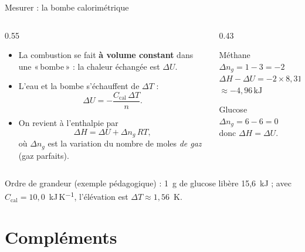 \documentclass[aspectratio=169,10pt]{beamer}
\newcommand{\kJ}{\ensuremath{\,\mathrm{kJ}}}
\newcommand{\guil}[1]{«\,#1\,»}
\begin{document}
\begin{frame}{Mesurer : la bombe calorimétrique}
  \begin{columns}[T]
    \begin{column}{0.55\textwidth}
      \begin{itemize}
        \item La combustion se fait \textbf{à volume constant} dans une
          \guil{bombe} : la chaleur échangée est $\Delta U$.
        \item L'eau et la bombe s'échauffent de $\Delta T$ :
          \[ \Delta U = -\frac{C_{\text{cal}}\,\Delta T}{n}. \]
        \item On revient à l'enthalpie par
          \[ \Delta H = \Delta U + \Delta n_g\,RT, \]
          où $\Delta n_g$ est la variation du nombre de moles \emph{de gaz}
          (gaz parfaits).
      \end{itemize}
    \end{column}
    \begin{column}{0.43\textwidth}
      \begin{block}{Méthane}
        \footnotesize
        \\
        $\Delta n_g = 1 - 3 = -2$\\
        $\Delta H - \Delta U = -2 \times 8{,}314 \times 298{,}15 / 1000$\\
        $\approx -4{,}96\kJ$
      \end{block}
      \begin{block}{Glucose}
        \footnotesize
        $\Delta n_g = 6 - 6 = 0$\\
        donc $\Delta H = \Delta U$.
      \end{block}
    \end{column}
  \end{columns}
  \vspace{3mm}
  {\footnotesize Ordre de grandeur (exemple pédagogique) : 1~g de glucose libère
  15,6~kJ ; avec $C_{\text{cal}} = 10{,}0$~kJ\,K\textsuperscript{$-1$},
  l'élévation est $\Delta T \approx 1{,}56$~K.}
\end{frame}

\section{Compléments}
\end{document}

